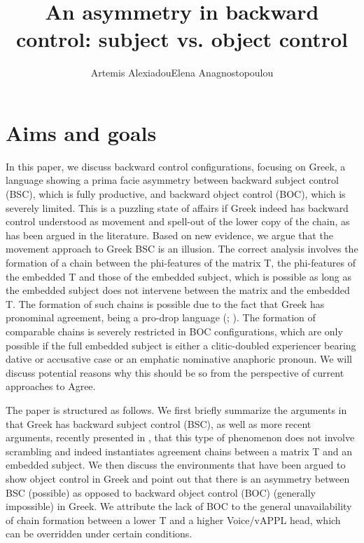 \documentclass[output=paper]{langsci/langscibook}
\author{Artemis Alexiadou\affiliation{Humboldt-Universität zu Berlin \& Leibniz-Zentrum Allgemeine Sprachwissenschaft, Berlin}\lastand Elena Anagnostopoulou\affiliation{University of Crete}}
\title{An asymmetry in backward control: subject vs. object control}
\begin{document}
\citereset

 

\section{Aims and goals}

In this paper, we discuss backward control configurations, focusing on Greek, a language showing a prima facie asymmetry between backward subject control (BSC), which is fully productive, and backward object control (BOC), which is severely limited. This is a puzzling state of affairs if Greek indeed has backward control understood as movement and spell-out of the lower copy of the chain, as has been argued in the literature. Based on new evidence, we argue that the movement approach to Greek BSC is an illusion. The correct analysis involves the formation of a chain between the phi-features of the matrix T, the phi-features of the embedded T and those of the embedded subject, which is possible as long as the embedded subject does not intervene between the matrix and the embedded T. The formation of such chains is possible due to the fact that Greek has pronominal agreement, being a pro-drop language (\citealt{Alexiadou1998}; \citealt{Barbosa2009}). The formation of comparable chains is severely restricted in BOC configurations, which are only possible if the full embedded subject is either a clitic-doubled experiencer bearing dative or accusative case or an emphatic nominative anaphoric pronoun. We will discuss potential reasons why this should be so from the perspective of current approaches to Agree.

The paper is structured as follows. We first briefly summarize the arguments in \citet{Alexiadou2010} that Greek has backward subject control (BSC), as well as more recent arguments, recently presented in \citet{Tsakali2017}, that this type of phenomenon does not involve scrambling and indeed instantiates agreement chains between a matrix T and an embedded subject. We then discuss the environments that have been argued to show object control in Greek and point out that there is an asymmetry between BSC (possible) as opposed to backward object control (BOC) (generally impossible) in Greek. We attribute the lack of BOC to the general unavailability of chain formation between a lower T and a higher Voice\slash vAPPL head, which can be overridden under certain conditions.
\end{document}
